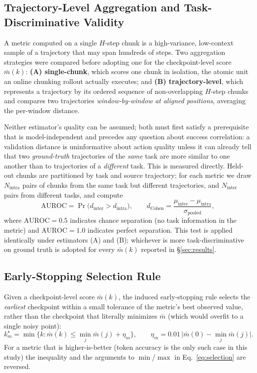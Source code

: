 \documentclass[11pt]{article}
\numberwithin{equation}{section}
\numberwithin{table}{section}
\numberwithin{figure}{section}
\begin{document}
\subsection{Trajectory-Level Aggregation and Task-Discriminative Validity}
\label{sec:method-taskdisc}

A metric computed on a single $H$-step chunk is a high-variance, low-context sample of a trajectory that
may span hundreds of steps. Two aggregation strategies were compared before adopting one for the
checkpoint-level score $\bar m(k)$: \textbf{(A) single-chunk}, which scores one chunk in isolation, the
atomic unit an online chunking rollout actually executes; and \textbf{(B) trajectory-level}, which
represents a trajectory by its ordered sequence of non-overlapping $H$-step chunks and compares two
trajectories \emph{window-by-window at aligned positions}, averaging the per-window distance.

Neither estimator's quality can be assumed; both must first satisfy a prerequisite that is
model-independent and precedes any question about success correlation: a validation distance is
uninformative about action quality unless it can already tell that two \emph{ground-truth} trajectories
of the \emph{same} task are more similar to one another than to trajectories of a \emph{different} task.
This is measured directly. Held-out chunks are partitioned by task and source trajectory; for each metric
we draw $N_{\mathrm{intra}}$ pairs of chunks from the same task but different trajectories, and
$N_{\mathrm{inter}}$ pairs from different tasks, and compute
\begin{equation}
  \mathrm{AUROC} = \Pr\big(d_{\mathrm{inter}} > d_{\mathrm{intra}}\big),
  \qquad
  d_{\mathrm{Cohen}} = \frac{\mu_{\mathrm{inter}}-\mu_{\mathrm{intra}}}{\sigma_{\mathrm{pooled}}},
  \label{eq:taskdisc}
\end{equation}
where $\mathrm{AUROC}=0.5$ indicates chance separation (no task information in the metric) and
$\mathrm{AUROC}=1.0$ indicates perfect separation. This test is applied identically under estimators (A)
and (B); whichever is more task-discriminative on ground truth is adopted for every $\bar m(k)$ reported
in \S\ref{sec:results}.

\subsection{Early-Stopping Selection Rule}
\label{sec:method-selection}

Given a checkpoint-level score $\bar m(k)$, the induced early-stopping rule selects the \emph{earliest}
checkpoint within a small tolerance of the metric's best observed value, rather than the checkpoint that
literally minimizes $\bar m$ (which would overfit to a single noisy point):
\begin{equation}
  k_m^\star = \min\Big\{k : \bar m(k) \le \min_j \bar m(j) + \eta_m\Big\}, \qquad
  \eta_m = 0.01\,\big|\bar m(0)-\min_j \bar m(j)\big|.
  \label{eq:selection}
\end{equation}
For a metric that is higher-is-better (token accuracy is the only such case in this study) the
inequality and the arguments to $\min$/$\max$ in Eq.~\ref{eq:selection} are reversed.
\end{document}

